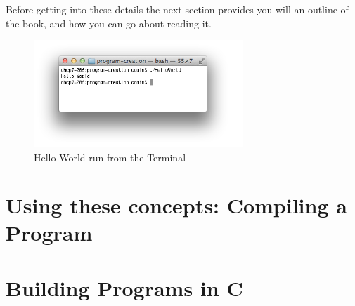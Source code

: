 Before getting into these details the next section provides you will an outline of the book, and how you can go about reading it.

\begin{figure}[b]
   \centering
   \includegraphics[width=0.7\textwidth]{./topics/programs-and-compilers/images/HelloWorld} 
   \caption{Hello World run from the Terminal}
   \label{fig:run-1-helloworld}
\end{figure}








% 







\clearpage
\section{Using these concepts: Compiling a Program} %
\label{sec:using_these_concepts_compiling_a_program}




\clearpage
\def\pageLang{c}
\section{Building Programs in C} %
\label{sec:building_programs_in_c}









